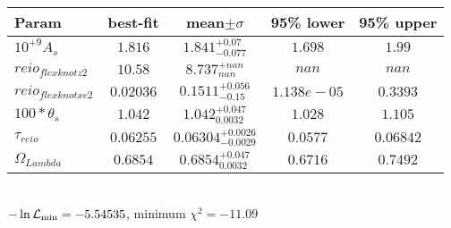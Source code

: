 \begin{tabular}{|l|c|c|c|c|} 
 \hline 
Param & best-fit & mean$\pm\sigma$ & 95\% lower & 95\% upper \\ \hline 
$10^{+9}A_{s }$ &$1.816$ & $1.841_{-0.077}^{+0.07}$ & $1.698$ & $1.99$ \\ 
$reio_{flexknot z  2 }$ &$10.58$ & $8.737_{nan}^{+nan}$ & $nan$ & $nan$ \\ 
$reio_{flexknot xe  2 }$ &$0.02036$ & $0.1511_{-0.15}^{+0.056}$ & $1.138e-05$ & $0.3393$ \\ 
$100*\theta{}_{s }$ &$1.042$ & $1.042_{0.0032}^{+0.047}$ & $1.028$ & $1.105$ \\ 
$\tau{}_{reio }$ &$0.06255$ & $0.06304_{-0.0029}^{+0.0026}$ & $0.0577$ & $0.06842$ \\ 
$\Omega{}_{Lambda }$ &$0.6854$ & $0.6854_{0.0032}^{+0.047}$ & $0.6716$ & $0.7492$ \\ 
\hline 
 \end{tabular} \\ 
$-\ln{\cal L}_\mathrm{min} =-5.54535$, minimum $\chi^2=-11.09$ \\ 
